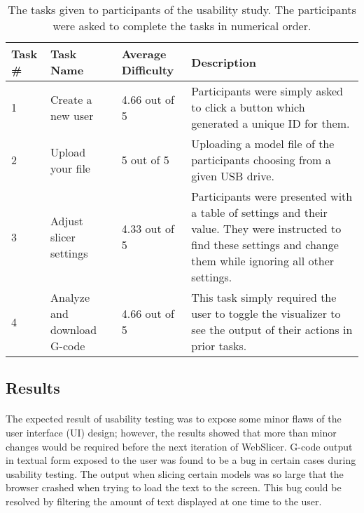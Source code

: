 \begin{table}[h]
  \centering
    \begin{tabularx}{\textwidth}{ |l|l|l|X| }
      \hline
      Task \# & Task Name & Average Difficulty & Description \\ \hline
      \hline
      1 & Create a new user & 4.66 out of 5 & Participants were simply asked to click a button which generated a unique ID for them. \\ \hline
      2 & Upload your file & 5 out of 5 & Uploading a model file of the participants choosing from a given USB drive. \\ \hline
      3 & Adjust slicer settings & 4.33 out of 5 & Participants were presented with a table of settings and their value. They were instructed to find these settings and change them while ignoring all other settings. \\ \hline
      4 & Analyze and download G-code & 4.66 out of 5 & This task simply required the user to toggle the visualizer to see the output of their actions in prior tasks. \\ \hline
    \end{tabularx}
  \caption{The tasks given to participants of the usability study. The participants were asked to complete the tasks in numerical order.}
  \label{tab:tasks}
\end{table}

\subsection{Results}
\paragraph{}
The expected result of usability testing was to expose some minor flaws of the user interface (UI) design; however, the results showed that more than minor changes would be required before the next iteration of WebSlicer.
G-code output in textual form exposed to the user was found to be a bug in certain cases during usability testing.
The output when slicing certain models was so large that the browser crashed when trying to load the text to the screen.
This bug could be resolved by filtering the amount of text displayed at one time to the user.

